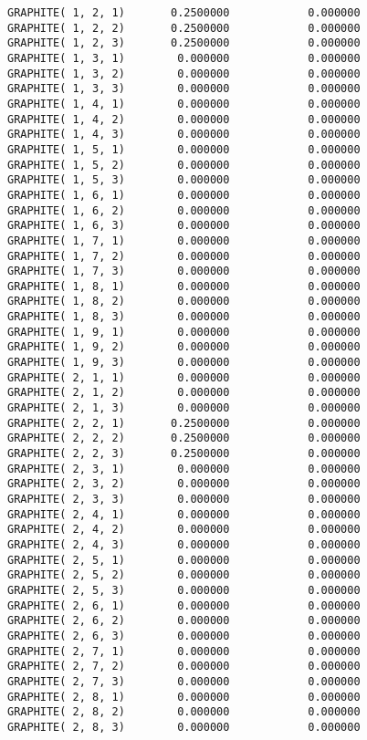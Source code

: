 \documentclass[12pt]{article}
\begin{document}
\begin{appendices}
\begin{lstlisting}
GRAPHITE( 1, 2, 1)       0.2500000            0.000000
GRAPHITE( 1, 2, 2)       0.2500000            0.000000
GRAPHITE( 1, 2, 3)       0.2500000            0.000000
GRAPHITE( 1, 3, 1)        0.000000            0.000000
GRAPHITE( 1, 3, 2)        0.000000            0.000000
GRAPHITE( 1, 3, 3)        0.000000            0.000000
GRAPHITE( 1, 4, 1)        0.000000            0.000000
GRAPHITE( 1, 4, 2)        0.000000            0.000000
GRAPHITE( 1, 4, 3)        0.000000            0.000000
GRAPHITE( 1, 5, 1)        0.000000            0.000000
GRAPHITE( 1, 5, 2)        0.000000            0.000000
GRAPHITE( 1, 5, 3)        0.000000            0.000000
GRAPHITE( 1, 6, 1)        0.000000            0.000000
GRAPHITE( 1, 6, 2)        0.000000            0.000000
GRAPHITE( 1, 6, 3)        0.000000            0.000000
GRAPHITE( 1, 7, 1)        0.000000            0.000000
GRAPHITE( 1, 7, 2)        0.000000            0.000000
GRAPHITE( 1, 7, 3)        0.000000            0.000000
GRAPHITE( 1, 8, 1)        0.000000            0.000000
GRAPHITE( 1, 8, 2)        0.000000            0.000000
GRAPHITE( 1, 8, 3)        0.000000            0.000000
GRAPHITE( 1, 9, 1)        0.000000            0.000000
GRAPHITE( 1, 9, 2)        0.000000            0.000000
GRAPHITE( 1, 9, 3)        0.000000            0.000000
GRAPHITE( 2, 1, 1)        0.000000            0.000000
GRAPHITE( 2, 1, 2)        0.000000            0.000000
GRAPHITE( 2, 1, 3)        0.000000            0.000000
GRAPHITE( 2, 2, 1)       0.2500000            0.000000
GRAPHITE( 2, 2, 2)       0.2500000            0.000000
GRAPHITE( 2, 2, 3)       0.2500000            0.000000
GRAPHITE( 2, 3, 1)        0.000000            0.000000
GRAPHITE( 2, 3, 2)        0.000000            0.000000
GRAPHITE( 2, 3, 3)        0.000000            0.000000
GRAPHITE( 2, 4, 1)        0.000000            0.000000
GRAPHITE( 2, 4, 2)        0.000000            0.000000
GRAPHITE( 2, 4, 3)        0.000000            0.000000
GRAPHITE( 2, 5, 1)        0.000000            0.000000
GRAPHITE( 2, 5, 2)        0.000000            0.000000
GRAPHITE( 2, 5, 3)        0.000000            0.000000
GRAPHITE( 2, 6, 1)        0.000000            0.000000
GRAPHITE( 2, 6, 2)        0.000000            0.000000
GRAPHITE( 2, 6, 3)        0.000000            0.000000
GRAPHITE( 2, 7, 1)        0.000000            0.000000
GRAPHITE( 2, 7, 2)        0.000000            0.000000
GRAPHITE( 2, 7, 3)        0.000000            0.000000
GRAPHITE( 2, 8, 1)        0.000000            0.000000
GRAPHITE( 2, 8, 2)        0.000000            0.000000
GRAPHITE( 2, 8, 3)        0.000000            0.000000

\end{lstlisting}
\end{appendices}
\end{document}
